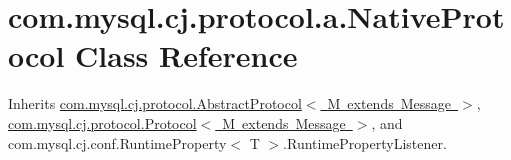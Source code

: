 \hypertarget{classcom_1_1mysql_1_1cj_1_1protocol_1_1a_1_1_native_protocol}{}\section{com.\+mysql.\+cj.\+protocol.\+a.\+Native\+Protocol Class Reference}
\label{classcom_1_1mysql_1_1cj_1_1protocol_1_1a_1_1_native_protocol}


Inherits \mbox{\hyperlink{classcom_1_1mysql_1_1cj_1_1protocol_1_1_abstract_protocol}{com.\+mysql.\+cj.\+protocol.\+Abstract\+Protocol$<$ M extends Message $>$}}, \mbox{\hyperlink{interfacecom_1_1mysql_1_1cj_1_1protocol_1_1_protocol}{com.\+mysql.\+cj.\+protocol.\+Protocol$<$ M extends Message $>$}}, and com.\+mysql.\+cj.\+conf.\+Runtime\+Property$<$ T $>$.\+Runtime\+Property\+Listener.

